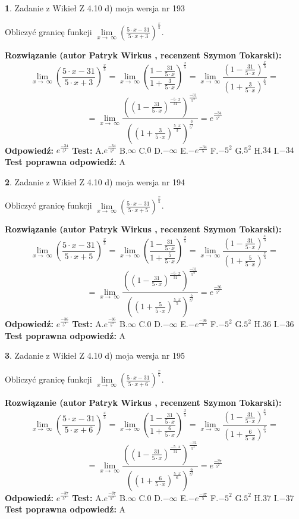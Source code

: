 \documentclass[12pt, a4paper]{article}
\theoremstyle{definition} %
\newtheorem{zad}{}
\newcommand{\zadStart}[1]{\begin{zad}#1\newline}
\newcommand{\zadStop}{\end{zad}}
\newcommand{\rozwStart}[2]{\noindent \textbf{Rozwiązanie (autor #1 , recenzent #2): }\newline}
\newcommand{\rozwStop}{\newline}
\newcommand{\odpStart}{\noindent \textbf{Odpowiedź:}\newline}
\newcommand{\odpStop}{\newline}
\newcommand{\testStart}{\noindent \textbf{Test:}\newline}
\newcommand{\testStop}{\newline}
\newcommand{\kluczStart}{\noindent \textbf{Test poprawna odpowiedź:}\newline}
\newcommand{\kluczStop}{\newline}
\begin{document}
\zadStart{Zadanie z Wikieł Z 4.10 d) moja wersja nr 193}


Obliczyć granicę funkcji  $\lim\limits_{x\to\ \infty}(\frac{5\cdot x-31}{5\cdot x+3})^{\frac{x}{5}}$.
\zadStop
\rozwStart{Patryk Wirkus}{Szymon Tokarski}
$$\lim\limits_{x\to\ \infty}(\frac{5\cdot x-31}{5\cdot x+3})^{\frac{x}{5}} = \lim\limits_{x\to\ \infty}(\frac{1-\frac{31}{5\cdot x}}{1+\frac{3}{5\cdot x}})^{\frac{x}{5}}=\lim\limits_{x\to\ \infty}\frac{(1-\frac{31}{5\cdot x})^{\frac{x}{5}}}{(1+\frac{3}{5\cdot x})^{\frac{x}{5}}}=$$
$$=\lim\limits_{x\to\ \infty}\frac{((1-\frac{31}{5\cdot x})^{\frac{-5\cdot x}{31}})^{\frac{-31}{5^{2}}}}{((1+\frac{3}{5\cdot x})^{\frac{5\cdot x}{3}})^{\frac{3}{5^{2}}}}=e^{\frac{-34}{5^{2}}}$$
\rozwStop
\odpStart
$e^{\frac{-34}{5^{2}}}$
\odpStop
\testStart
A.$e^{\frac{-34}{5^{2}}}$ B.$\infty$ C.$0$ D.$-\infty$ E.$-e^{\frac{-34}{5}}$
F.$-5^{2}$ G.$5^{2}$
H.$34$
I.$-34$
\testStop
\kluczStart
A
\kluczStop



\zadStart{Zadanie z Wikieł Z 4.10 d) moja wersja nr 194}


Obliczyć granicę funkcji  $\lim\limits_{x\to\ \infty}(\frac{5\cdot x-31}{5\cdot x+5})^{\frac{x}{5}}$.
\zadStop
\rozwStart{Patryk Wirkus}{Szymon Tokarski}
$$\lim\limits_{x\to\ \infty}(\frac{5\cdot x-31}{5\cdot x+5})^{\frac{x}{5}} = \lim\limits_{x\to\ \infty}(\frac{1-\frac{31}{5\cdot x}}{1+\frac{5}{5\cdot x}})^{\frac{x}{5}}=\lim\limits_{x\to\ \infty}\frac{(1-\frac{31}{5\cdot x})^{\frac{x}{5}}}{(1+\frac{5}{5\cdot x})^{\frac{x}{5}}}=$$
$$=\lim\limits_{x\to\ \infty}\frac{((1-\frac{31}{5\cdot x})^{\frac{-5\cdot x}{31}})^{\frac{-31}{5^{2}}}}{((1+\frac{5}{5\cdot x})^{\frac{5\cdot x}{5}})^{\frac{5}{5^{2}}}}=e^{\frac{-36}{5^{2}}}$$
\rozwStop
\odpStart
$e^{\frac{-36}{5^{2}}}$
\odpStop
\testStart
A.$e^{\frac{-36}{5^{2}}}$ B.$\infty$ C.$0$ D.$-\infty$ E.$-e^{\frac{-36}{5}}$
F.$-5^{2}$ G.$5^{2}$
H.$36$
I.$-36$
\testStop
\kluczStart
A
\kluczStop



\zadStart{Zadanie z Wikieł Z 4.10 d) moja wersja nr 195}


Obliczyć granicę funkcji  $\lim\limits_{x\to\ \infty}(\frac{5\cdot x-31}{5\cdot x+6})^{\frac{x}{5}}$.
\zadStop
\rozwStart{Patryk Wirkus}{Szymon Tokarski}
$$\lim\limits_{x\to\ \infty}(\frac{5\cdot x-31}{5\cdot x+6})^{\frac{x}{5}} = \lim\limits_{x\to\ \infty}(\frac{1-\frac{31}{5\cdot x}}{1+\frac{6}{5\cdot x}})^{\frac{x}{5}}=\lim\limits_{x\to\ \infty}\frac{(1-\frac{31}{5\cdot x})^{\frac{x}{5}}}{(1+\frac{6}{5\cdot x})^{\frac{x}{5}}}=$$
$$=\lim\limits_{x\to\ \infty}\frac{((1-\frac{31}{5\cdot x})^{\frac{-5\cdot x}{31}})^{\frac{-31}{5^{2}}}}{((1+\frac{6}{5\cdot x})^{\frac{5\cdot x}{6}})^{\frac{6}{5^{2}}}}=e^{\frac{-37}{5^{2}}}$$
\rozwStop
\odpStart
$e^{\frac{-37}{5^{2}}}$
\odpStop
\testStart
A.$e^{\frac{-37}{5^{2}}}$ B.$\infty$ C.$0$ D.$-\infty$ E.$-e^{\frac{-37}{5}}$
F.$-5^{2}$ G.$5^{2}$
H.$37$
I.$-37$
\testStop
\kluczStart
A
\kluczStop
\end{document}
